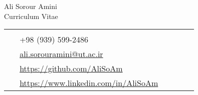 \documentclass[10pt]{article}
\begin{document}
  \begin{paracol}{2}
    \parbox[top][0.12\textheight][c]{\linewidth}{
      \vspace{-0.04\textheight}
      \centering
      {\sffamily\Huge Ali Sorour Amini}\\\medskip
      {\Huge\color{headings}\cvtextfont Curriculum Vitae}
    }

    \switchcolumn

    \parbox[top][0.12\textheight][c]{\linewidth}{
      \vspace{-0.04\textheight}
      \colorbox{shade}{
        \begin{supertabular}{p{0.05\linewidth}|p{0.775\linewidth}}
          \raisebox{-1pt}{\faHome} & \\
          \raisebox{-1pt}{\faPhone} & +98 (939) 599-2486 \\
          \raisebox{0pt}{\small\faEnvelope} & \href{mailto:ali.sorouramini@ut.ac.ir}{ali.sorouramini@ut.ac.ir} \\
          \raisebox{-1pt}{\faGithub} & \href{https://github.com/AliSoAm}{https://github.com/AliSoAm} \\
          \raisebox{-1pt}{\faLinkedinSquare} & \href{https://www.linkedin.com/in/AliSoAm}{https://www.linkedin.com/in/AliSoAm} \\
        \end{supertabular}
      }
    }
  \end{paracol}
\end{document}
